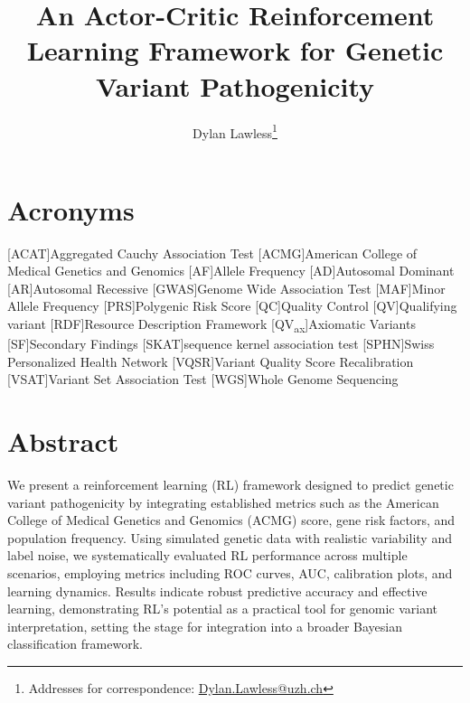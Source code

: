 
\usepackage[printonlyused,withpage,nohyperlinks]{acronym}

\newcommand{\boxlabel}[1]{%
  \refstepcounter{myboxcounter}%
  \label{#1}%
}

\title{An Actor-Critic Reinforcement Learning Framework for Genetic Variant Pathogenicity}

\author[1]{Dylan Lawless\thanks{Addresses for correspondence: \href{mailto:Dylan.Lawless@uzh.ch}{Dylan.Lawless@uzh.ch}}}

\maketitle
\justify

\section*{Acronyms}
\renewenvironment{description} %
{\list{}{\labelwidth0pt\itemindent-\leftmargin
    \parsep-1em\itemsep0pt\let\makelabel\descriptionlabel}}
               {\endlist}
\begin{acronym} 
 [ACAT]{Aggregated Cauchy Association Test }
 [ACMG]{American College of Medical Genetics and Genomics}
 [AF]{Allele Frequency}
 [AD]{Autosomal Dominant}
 [AR]{Autosomal Recessive}
 [GWAS]{Genome Wide Association Test}
 [MAF]{Minor Allele Frequency}
 [PRS]{Polygenic Risk Score} 
 [QC]{Quality Control}
 [QV]{Qualifying variant}
 [RDF]{Resource Description Framework}
 [QV\textsubscript{ax}]{Axiomatic Variants}
 [SF]{Secondary Findings}
 [SKAT]{sequence kernel association test} 
 [SPHN]{Swiss Personalized Health Network}
 [VQSR]{Variant Quality Score Recalibration}
 [VSAT]{Variant Set Association Test}
 [WGS]{Whole Genome Sequencing}
\end{acronym}
 
\section*{Abstract}
We present a reinforcement learning (RL) framework designed to predict genetic variant pathogenicity by integrating established metrics such as the American College of Medical Genetics and Genomics (ACMG) score, gene risk factors, and population frequency. Using simulated genetic data with realistic variability and label noise, we systematically evaluated RL performance across multiple scenarios, employing metrics including ROC curves, AUC, calibration plots, and learning dynamics. Results indicate robust predictive accuracy and effective learning, demonstrating RL’s potential as a practical tool for genomic variant interpretation, setting the stage for integration into a broader Bayesian classification framework.

